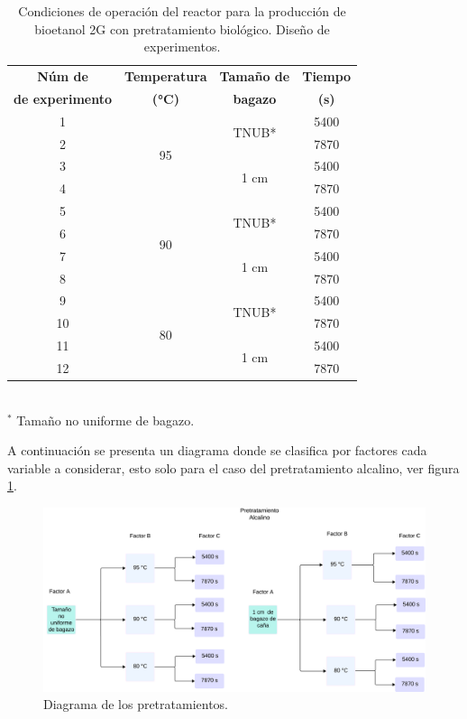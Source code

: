 \documentclass[12pt]{article}
\begin{document}
\begin{table}[H]
	\centering
	\caption{Condiciones de operación del reactor para la producción de bioetanol 2G con pretratamiento biológico. Diseño de experimentos.}
	\label{alcalino}
	\begin{tabular}{|c|c|c|c|}
		\hline
		\textbf{Núm de} & \textbf{Temperatura} & \textbf{Tamaño de } & \textbf{Tiempo} \\ 
		\textbf{de experimento}	&\textbf{ (°C)}&\textbf{ bagazo}  &\textbf{(s)}	\\ \hline
		1 & \multirow{4}{*}{95} & \multirow{2}{*}{TNUB*} & 5400   \\ \cline{1-1} \cline{4-4}
		2 &  &  & 7870  \\ \cline{3-4}  \cline{1-1} 
		3 &  & \multirow{2}{*}{1 cm} & 5400  \\  \cline{1-1} \cline{4-4}
		4 &  &  & 7870  \\ \cline{1-1}  \hline
		5 & \multirow{4}{*}{90}& \multirow{2}{*}{TNUB*} & 5400  \\ \cline{1-1}  \cline{4-4}
		6 &  &  & 7870   \\ \cline{1-1} \cline{3-4}
		7 &  & \multirow{2}{*}{1 cm} & 5400  \\ \cline{1-1}\cline{4-4}
		8 &  &  & 7870 \\ \hline
		9 & \multirow{4}{*}{80} & \multirow{2}{*}{TNUB*} & 5400  \\ \cline{1-1}\cline{4-4}
		10 &  &  & 7870   \\ \cline{1-1} \cline{3-4}
		11 &  &\multirow{2}{*}{1 cm} & 5400 \\ \cline{1-1}\cline{4-4}
		12 &  &  & 7870  \\ \hline
	\end{tabular}
		\\[3 pt] %
	\footnotesize{$^{*}$  Tamaño no uniforme de bagazo.}
\end{table}



A continuación se presenta un diagrama donde se clasifica por factores cada variable a considerar, esto solo para el caso del pretratamiento alcalino, ver figura  \ref{Diagrama1}.



\begin{figure} [H]
	\centering
	\includegraphics[width=0.9\linewidth]{imagenes/Diagrama alcalino}
	\caption{Diagrama de los pretratamientos.}
	\label{Diagrama1}
\end{figure}
\end{document}
